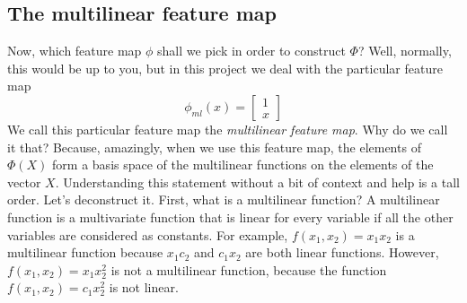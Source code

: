 \documentclass{article}
\theoremstyle{definition}
\theoremstyle{definition}
\begin{document}
\subsection{The multilinear feature map}
Now, which feature map $\phi$ shall we pick in order to construct $\Phi$?
Well, normally, this would be up to you, but in this project we deal with the particular feature map
\begin{equation}
    \phi_{ml}(x) = 
    \begin{bmatrix}
        1 \\
        x
    \end{bmatrix}
\end{equation}
We call this particular feature map the \emph{multilinear feature map}.
Why do we call it that? Because, amazingly, when we use this feature map, the elements of $\Phi(X)$ form a basis space of the multilinear functions on the elements of the vector $X$.
Understanding this statement without a bit of context and help is a tall order. Let's deconstruct it.
First, what is a multilinear function? A multilinear function is a multivariate function that is linear for every variable if all the other variables are considered as constants. For example, $f(x_1, x_2) = x_1 x_2$ is a multilinear function because $x_1 c_2$ and $c_1 x_2$ are both linear functions. However, $f(x_1, x_2) = x_1 x_2^2$ is not a multilinear function, because the function $f(x_1, x_2) = c_1 x_2^2$ is not linear.
\end{document}
